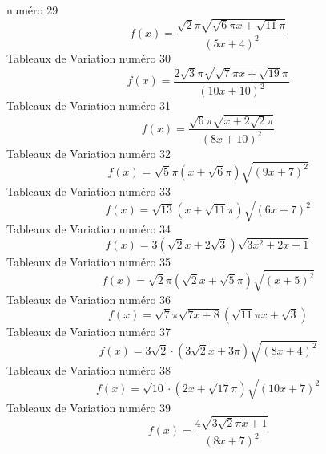 \documentclass{article}
\begin{document}
num\'ero 29 \[f(x) = \frac{\sqrt{2} \pi \sqrt{\sqrt{6} \pi x + \sqrt{11} \pi}}{\left(5 x + 4\right)^{2}}\]Tableaux de Variation num\'ero 30 \[f(x) = \frac{2 \sqrt{3} \pi \sqrt{\sqrt{7} \pi x + \sqrt{19} \pi}}{\left(10 x + 10\right)^{2}}\]Tableaux de Variation num\'ero 31 \[f(x) = \frac{\sqrt{6} \pi \sqrt{x + 2 \sqrt{2} \pi}}{\left(8 x + 10\right)^{2}}\]Tableaux de Variation num\'ero 32 \[f(x) = \sqrt{5} \pi \left(x + \sqrt{6} \pi\right) \sqrt{\left(9 x + 7\right)^{2}}\]Tableaux de Variation num\'ero 33 \[f(x) = \sqrt{13} \left(x + \sqrt{11} \pi\right) \sqrt{\left(6 x + 7\right)^{2}}\]Tableaux de Variation num\'ero 34 \[f(x) = 3 \left(\sqrt{2} x + 2 \sqrt{3}\right) \sqrt{3 x^{2} + 2 x + 1}\]Tableaux de Variation num\'ero 35 \[f(x) = \sqrt{2} \pi \left(\sqrt{2} x + \sqrt{5} \pi\right) \sqrt{\left(x + 5\right)^{2}}\]Tableaux de Variation num\'ero 36 \[f(x) = \sqrt{7} \pi \sqrt{7 x + 8} \left(\sqrt{11} \pi x + \sqrt{3}\right)\]Tableaux de Variation num\'ero 37 \[f(x) = 3 \sqrt{2} \cdot \left(3 \sqrt{2} x + 3 \pi\right) \sqrt{\left(8 x + 4\right)^{2}}\]Tableaux de Variation num\'ero 38 \[f(x) = \sqrt{10} \cdot \left(2 x + \sqrt{17} \pi\right) \sqrt{\left(10 x + 7\right)^{2}}\]Tableaux de Variation num\'ero 39 \[f(x) = \frac{4 \sqrt{3 \sqrt{2} \pi x + 1}}{\left(8 x + 7\right)^{2}}\]
\end{document}
